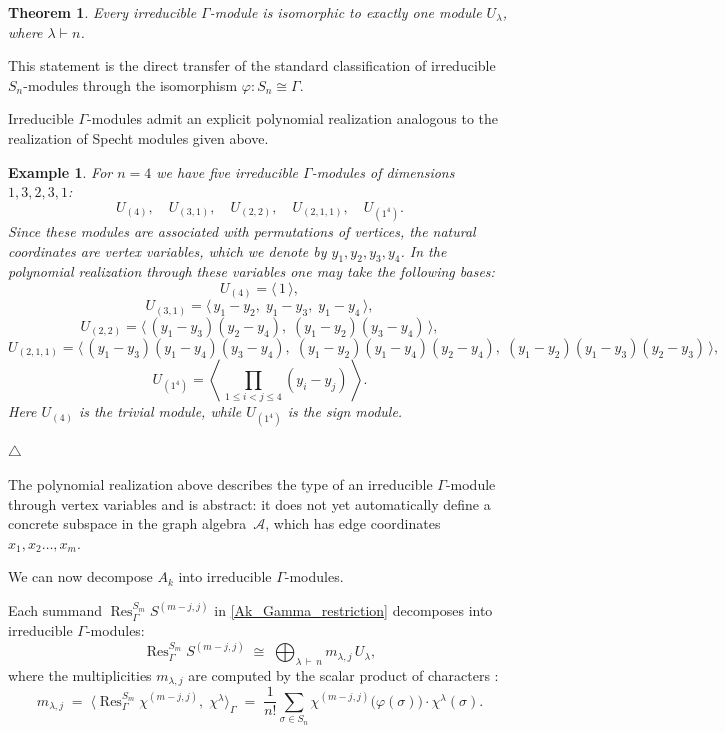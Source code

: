 \documentclass[12pt,reqno]{amsart}
\newtheorem{theorem}{Theorem}[section]
\newtheorem{example}{Example}[section]
\begin{document}
\begin{theorem}
Every irreducible $\Gamma$-module is isomorphic to exactly one module
$U_\lambda$, where $\lambda\vdash n$.
\end{theorem}

This statement is the direct transfer of the standard classification of
irreducible $S_n$-modules through the isomorphism $\varphi:S_n\cong\Gamma$.

\medskip

Irreducible $\Gamma$-modules admit an explicit polynomial realization
analogous to the realization of Specht modules given above.

\begin{example}
  For $n = 4$ we have five irreducible $\Gamma$-modules of dimensions
  $1,3,2,3,1$:
  $$
    U_{(4)},\quad
    U_{(3,1)},\quad
    U_{(2,2)},\quad
    U_{(2,1,1)},\quad
    U_{(1^4)}.
  $$
  Since these modules are associated with permutations of \emph{vertices},
  the natural coordinates are vertex variables, which we denote by
  $y_1,y_2,y_3,y_4$.
  In the polynomial realization through these variables one may take the
  following bases:
  $$
    U_{(4)}
    =
    \langle\,1\,\rangle,
  $$
  $$
    U_{(3,1)}
    =
    \langle\,
      y_1-y_2,\;
      y_1-y_3,\;
      y_1-y_4
    \,\rangle,
  $$
  $$
    U_{(2,2)}
    =
    \bigl\langle\,
      (y_1-y_3)(y_2-y_4),\;
      (y_1-y_2)(y_3-y_4)
    \,\bigr\rangle,
  $$
  $$
    U_{(2,1,1)}
    =
    \bigl\langle\,
      (y_1-y_3)(y_1-y_4)(y_3-y_4),\;
      (y_1-y_2)(y_1-y_4)(y_2-y_4),\;
      (y_1-y_2)(y_1-y_3)(y_2-y_3)
    \,\bigr\rangle,
  $$
  $$
    U_{(1^4)}
    =
    \left\langle\,
      \prod_{1\le i<j\le 4}(y_i-y_j)
    \,\right\rangle.
  $$
  Here $U_{(4)}$ is the trivial module, while $U_{(1^4)}$ is the sign module.

  $\triangle$
\end{example}

The polynomial realization above describes the type of an irreducible
$\Gamma$-module through vertex variables and is abstract: it does not yet
automatically define a concrete subspace in the graph algebra~$\mathcal{A}$,
which has edge coordinates
$x_1, x_2 \ldots, x_m$.

We can now decompose $A_k$ into irreducible $\Gamma$-modules.

Each summand $\operatorname{Res}^{S_m}_{\Gamma} S^{(m-j,j)}$ in
\eqref{Ak_Gamma_restriction} decomposes into irreducible $\Gamma$-modules:
$$
  \operatorname{Res}^{S_m}_{\Gamma} S^{(m-j,j)}
  \;\cong\;
  \bigoplus_{\lambda \,\vdash\, n}
  m_{\lambda,j}\, U_\lambda,
$$
where the multiplicities $m_{\lambda,j}$ are computed by the scalar product
of characters \cite[Chapter~2]{Sagan}:
$$
  m_{\lambda,j}
  \;=\;
  \bigl\langle
    \operatorname{Res}^{S_m}_{\Gamma}\chi^{(m-j,j)},\;
    \chi^\lambda
  \bigr\rangle_{\!\Gamma}
  \;=\;
  \frac{1}{n!}
  \sum_{\sigma \in S_n}
  \chi^{(m-j,j)}\!\bigl(\varphi(\sigma)\bigr)\cdot
  \chi^\lambda(\sigma).
$$
\end{document}
